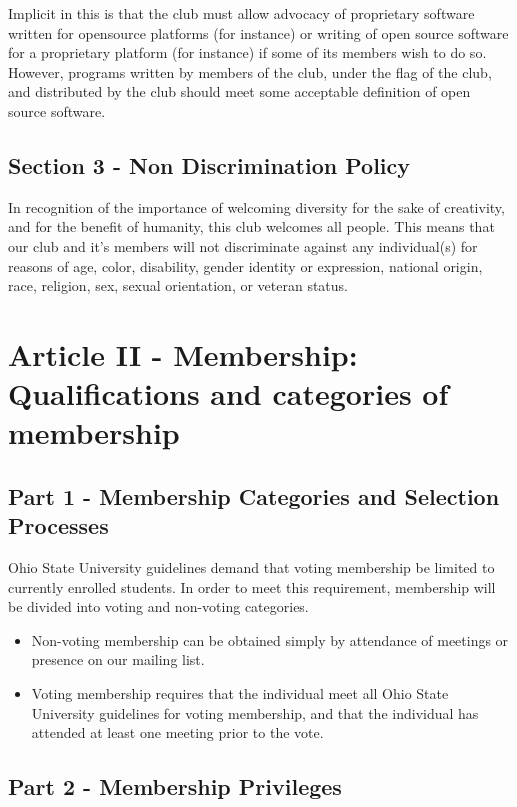 \documentclass{article}
\begin{document}
	Implicit in this is that the club must allow advocacy of proprietary software written for opensource platforms (for instance) or writing of open source software for a proprietary platform (for instance) if some of its members wish to do so. However, programs written by members of the club, under the flag of the club, and distributed by the club should meet some acceptable definition of open source software.

	\subsection{Section 3 - Non Discrimination Policy}

	In recognition of the importance of welcoming diversity for the sake of creativity, and for the benefit of humanity, this club welcomes all people. This means that our club and it's members will not discriminate against any individual(s) for reasons of age, color, disability, gender identity or expression, national origin, race, religion, sex, sexual orientation, or veteran status.

	\section{Article II - Membership: Qualifications and categories of membership}

	\subsection{Part 1 - Membership Categories and Selection Processes}
	Ohio State University guidelines demand that voting membership be limited to currently enrolled students.  In order to meet this requirement, membership will be divided into voting and non-voting categories.

	\begin{itemize}
		\item Non-voting membership can be obtained simply by attendance of meetings or presence on our mailing list.
		\item Voting membership requires that the individual meet all Ohio State University guidelines for voting membership, and that the individual has attended at least one meeting prior to the vote.
	\end{itemize}
	\subsection{Part 2 - Membership Privileges}
\end{document}
